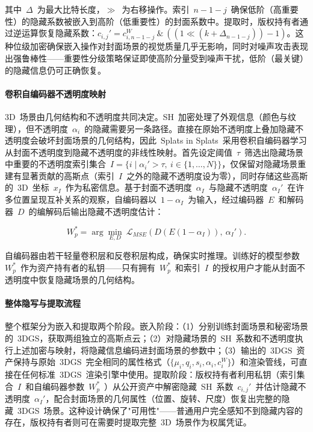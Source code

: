 其中~$\Delta$~为最大比特长度，$\gg$~为右移操作。索引~$n-1-j$~确保低阶（高重要性）的隐藏系数被嵌入到高阶（低重要性）的封面系数中。提取时，版权持有者通过逆运算恢复隐藏系数：$c_{i,j}' = c_{i,n-1-j}^W~\&~((1 \ll (k + \Delta_{n-1-j})) - 1)$。这种位级加密确保嵌入操作对封面场景的视觉质量几乎无影响，同时对噪声攻击表现出强鲁棒性——重要性分级策略保证即使高阶分量受到噪声干扰，低阶（最关键）的隐藏信息仍可正确恢复。

\paragraph{卷积自编码器不透明度映射}3D~场景由几何结构和不透明度共同决定。SH~加密处理了外观信息（颜色与纹理），但不透明度~$\alpha_i$~的隐藏需要另一条路径。直接在原始不透明度上叠加隐藏不透明度会破坏封面场景的几何结构，因此~Splats in Splats~采用卷积自编码器学习从封面不透明度到隐藏不透明度的非线性映射。首先设定阈值~$\tau$~筛选出隐藏场景中重要的不透明度索引集合~$I = \{i \mid \alpha_i' > \tau,~i \in \{1,\ldots,N\}\}$，仅保留对隐藏场景重建有显著贡献的高斯点（索引~$I$~之外的隐藏不透明度设为零），同时存储这些高斯的~3D~坐标~$x_I$~作为私密信息。基于封面不透明度~$\alpha_I$~与隐藏不透明度~$\alpha_I'$~在许多位置呈现互补关系的观察，自编码器以~$1 - \alpha_I$~为输入，经过编码器~$E$~和解码器~$D$~的编解码后输出隐藏不透明度估计：

\begin{equation}
    W_p^* = \arg\min_{E,D}~\mathcal{L}_{MSE}(D(E(1 - \alpha_I)),~\alpha_I').
\end{equation}

自编码器由若干轻量卷积层和反卷积层构成，确保实时推理。训练好的模型参数~$W_p^*$~作为资产持有者的私钥——只有拥有~$W_p^*$~和索引~$I$~的授权用户才能从封面不透明度中恢复隐藏场景的几何结构。

\paragraph{整体隐写与提取流程}整个框架分为嵌入和提取两个阶段。嵌入阶段：（1）分别训练封面场景和秘密场景的~3DGS，获取两组独立的高斯点云；（2）对隐藏场景的~SH~系数和不透明度执行上述加密与映射，将隐藏信息编码进封面场景的参数中；（3）输出的~3DGS~资产保持与原始~3DGS~完全相同的属性格式（$\{\mu_i, q_i, s_i, \alpha_i, c_i^W\}$）和渲染管线，可直接在任何标准~3DGS~渲染引擎中使用。提取阶段：版权持有者利用私钥（索引集合~$I$~和自编码器参数~$W_p^*$~）从公开资产中解密隐藏~SH~系数~$c_{i,j}'$~并估计隐藏不透明度~$\alpha_I'$，配合封面场景的几何属性（位置、旋转、尺度）恢复出完整的隐藏~3DGS~场景。这种设计确保了"可用性"——普通用户完全感知不到隐藏内容的存在，版权持有者则可在需要时提取完整~3D~场景作为权属凭证。

